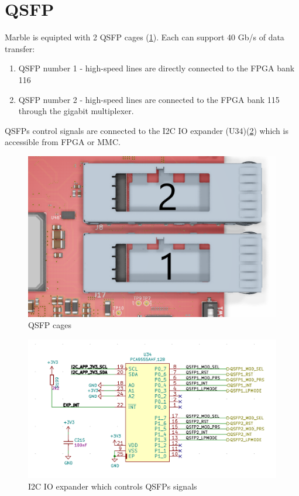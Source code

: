 \documentclass[12pt,oneside,a4]{article}
\begin{document}
\section{QSFP}
Marble is equipted with 2 QSFP cages (\ref{qsfp}). Each can support 40 Gb/s of data transfer:
\begin{enumerate}
	\item QSFP number 1 - high-speed lines are directly connected to the FPGA bank 116
	\item QSFP number 2 - high-speed lines are connected to the FPGA bank 115 through the gigabit multiplexer. 
\end{enumerate}

QSFPs control signals are connected to the I2C IO expander (U34)(\ref{qsfpio}) which is accessible from FPGA or MMC.

\begin{figure}[H]
\begin{center}
\includegraphics[width=0.8\linewidth]{qsfp.png}
 \caption{QSFP cages}\label{qsfp}
\end{center}
\end{figure}

\begin{figure}[H]
\begin{center}
\includegraphics[width=0.8\linewidth]{qsfpio.png}
 \caption{I2C IO expander which controls QSFPs signals}\label{qsfpio}
\end{center}
\end{figure}
\end{document}
